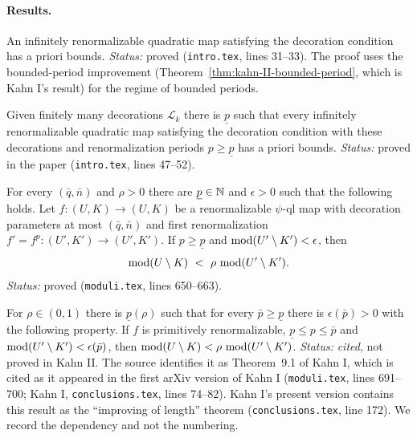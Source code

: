 \paragraph{Results.}

\begin{theorem}
\label{thm:kahn-II-main}
An infinitely renormalizable quadratic map satisfying the decoration condition has a priori
bounds.  \emph{Status:} proved (\texttt{intro.tex}, lines 31--33).  The proof uses the
bounded-period improvement (Theorem~\ref{thm:kahn-II-bounded-period}, which is Kahn I's result)
for the regime of bounded periods.
\end{theorem}

\begin{theorem}
\label{thm:kahn-II-high}
Given finitely many decorations $\mathcal L_k$ there is $\underline p$ such that every
infinitely renormalizable quadratic map satisfying the decoration condition with these
decorations and renormalization periods $p\ge\underline p$ has a priori bounds.
\emph{Status:} proved in the paper (\texttt{intro.tex}, lines 47--52).
\end{theorem}

\begin{theorem}
\label{thm:kahn-II-moduli}
For every $(\bar q,\bar n)$ and $\rho>0$ there are $\underline p\in\mathbb N$ and $\epsilon>0$ such
that the following holds.  Let $f\colon(U,K)\to(U,K)$ be a renormalizable $\psi$-ql map with
decoration parameters at most $(\bar q,\bar n)$ and first renormalization $f'=f^p\colon(U',K')\to(U',K')$.
If $p\ge\underline p$ and $\operatorname{mod}(U'\setminus K')<\epsilon$, then
\[
\modulus(U\setminus K)\ <\ \rho\,\modulus(U'\setminus K').
\]
\emph{Status:} proved (\texttt{moduli.tex}, lines 650--663).
\end{theorem}

\begin{theorem}
\label{thm:kahn-II-bounded-period}
For $\rho\in(0,1)$ there is $\underline p(\rho)$ such that for every $\bar p\ge\underline p$
there is $\epsilon(\bar p)>0$ with the following property.  If $f$ is primitively
renormalizable, $\underline p\le p\le\bar p$ and $\operatorname{mod}(U'\setminus K')<\epsilon(\bar p)$,
then $\operatorname{mod}(U\setminus K)<\rho\,\operatorname{mod}(U'\setminus K')$.
\emph{Status:} \emph{cited}, not proved in Kahn II.  The source identifies it as Theorem~9.1
of Kahn I, which is cited as it appeared in the first arXiv version of Kahn I
(\texttt{moduli.tex}, lines 691--700; Kahn I, \texttt{conclusions.tex}, lines 74--82).
Kahn I's present version contains this result as the ``improving of length'' theorem
(\texttt{conclusions.tex}, line 172).  We record the dependency and not the numbering.
\end{theorem}

